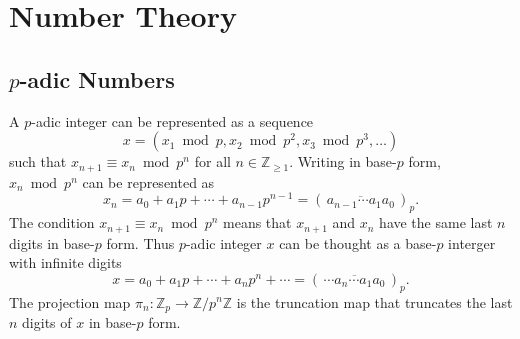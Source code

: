 \documentclass{report}
\begin{document}
\chapter{Number Theory}
\section{$p$-adic Numbers}


A $p$-adic integer can be represented as a sequence
$$
x=\left(x_1 \bmod p, x_2 \bmod p^2, x_3 \bmod p^3, \ldots\right)
$$
such that $x_{n+1}\equiv x_n \bmod p^n$ for all $n\in \mathbb{Z}_{\ge 1}$. Writing in base-$p$ form, $x_n \bmod p^n$ can be represented as 
\[
x_n =a_0+a_1p+\cdots+a_{n-1}p^{n-1}= \left(\,\overline{ a_{n-1}\cdots a_1a_0}\,\right)_p.    
\]
The condition $x_{n+1}\equiv x_n \bmod p^n$ means that $x_{n+1}$ and $x_n$ have the same last $n$ digits in base-$p$ form. Thus $p$-adic integer $x$ can be thought as a base-$p$ interger with infinite digits
\[
x =a_0+a_1p+\cdots+a_{n}p^{n}+\cdots= \left(\,\overline{\cdots a_{n}\cdots a_1a_0}\,\right)_p.
\]
The projection map $\pi_n:\mathbb{Z}_p\to \mathbb{Z}/p^n\mathbb{Z}$ is the  truncation map that truncates the last $n$ digits of $x$ in base-$p$ form.

\end{document}
